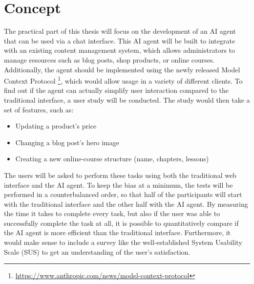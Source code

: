 \documentclass[12pt,a4paper]{article}
\begin{document}
\section*{Concept}
The practical part of this thesis will focus on the development of an AI agent that can be used via a chat interface.
This AI agent will be built to integrate with an existing content management system, which allows administrators to manage resources such as blog posts, shop products, or online courses.
Additionally, the agent should be implemented using the newly released Model Context Protocol \footnote{\url{https://www.anthropic.com/news/model-context-protocol}}, which would allow usage in a variety of different clients.
To find out if the agent can actually simplify user interaction compared to the traditional interface, a user study will be conducted. The study would then take a set of features, such as:
\begin{itemize}
	\item Updating a product's price
	\item Changing a blog post's hero image
	\item Creating a new online-course structure (name, chapters, lessons)
\end{itemize}

The users will be asked to perform these tasks using both the traditional web interface and the AI agent. To keep the bias at a minimum, the tests will be performed in a counterbalanced order, so that half of the participants will start with the traditional interface and the other half with the AI agent. By measuring the time it takes to complete every task, but also if the user was able to successfully complete the task at all, it is possible to quantitatively compare if the AI agent is more efficient than the traditional interface.
Furthermore, it would make sense to include a survey like the well-established System Usability Scale (SUS) \autocite{brooke_sus_1995} to get an understanding of the user's satisfaction.
\end{document}
